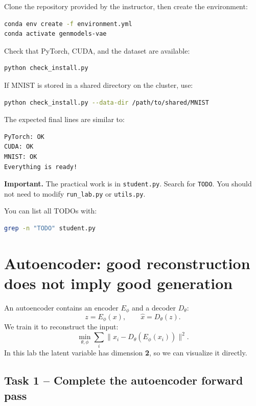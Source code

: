 \documentclass[11pt,a4paper]{article}
\begin{document}
Clone the repository provided by the instructor, then create the environment:

\begin{lstlisting}[language=bash]
conda env create -f environment.yml
conda activate genmodels-vae
\end{lstlisting}

Check that PyTorch, CUDA, and the dataset are available:

\begin{lstlisting}[language=bash]
python check_install.py
\end{lstlisting}

If MNIST is stored in a shared directory on the cluster, use:

\begin{lstlisting}[language=bash]
python check_install.py --data-dir /path/to/shared/MNIST
\end{lstlisting}

The expected final lines are similar to:

\begin{lstlisting}
PyTorch: OK
CUDA: OK
MNIST: OK
Everything is ready!
\end{lstlisting}

\noindent\textbf{Important.} The practical work is in \texttt{student.py}. Search for \texttt{TODO}. You should not need to modify \texttt{run\_lab.py} or \texttt{utils.py}.

You can list all TODOs with:

\begin{lstlisting}[language=bash]
grep -n "TODO" student.py
\end{lstlisting}

\section{Autoencoder: good reconstruction does not imply good generation}

An autoencoder contains an encoder $E_\phi$ and a decoder $D_\theta$:
\[
z = E_\phi(x), \qquad \hat x = D_\theta(z).
\]
We train it to reconstruct the input:
\[
\min_{\theta,\phi} \sum_i \|x_i - D_\theta(E_\phi(x_i))\|^2.
\]
In this lab the latent variable has dimension \textbf{2}, so we can visualize it directly.

\subsection*{Task 1 -- Complete the autoencoder forward pass}
\end{document}
